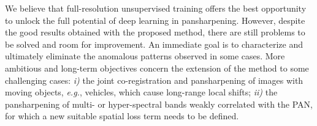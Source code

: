 \documentclass[journal]{IEEEtran}
\begin{document}
We believe that full-resolution unsupervised training offers the best opportunity to unlock the full potential of deep learning in pansharpening.
However, despite the good results obtained with the proposed method, there are still problems to be solved and room for improvement.
An immediate goal is to characterize and ultimately eliminate the anomalous patterns observed in some cases.
More ambitious and long-term objectives concern the extension of the method to some challenging cases:
{\it  i)} the joint co-registration and pansharpening of images with moving objects, {\it e.g.}, vehicles, which cause long-range local shifts;
{\it ii)} the pansharpening of multi- or hyper-spectral bands weakly correlated with the PAN, for which a new suitable spatial loss term needs to be defined.



\balance


\end{document}
